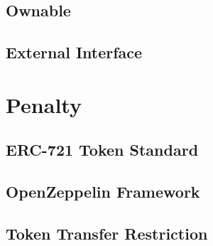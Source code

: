 \subsection{Ownable}
\subsection{External Interface}

\section{Penalty}
\subsection{ERC-721 Token Standard}
\subsection{OpenZeppelin Framework}
\subsection{Token Transfer Restriction}